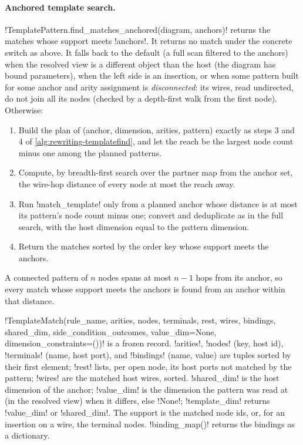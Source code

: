 \paragraph{Anchored template search.}
\py!TemplatePattern.find_matches_anchored(diagram, anchors)! returns the matches whose support
meets \py!anchors!. It returns no match under the concrete switch as above. It falls back to the
default (a full scan filtered to the anchors) when the resolved view is a different object than the
host (the diagram has bound parameters), when the left side is an insertion, or when some pattern
built for some anchor and arity assignment is \emph{disconnected}: its wires, read undirected, do
not join all its nodes (checked by a depth-first walk from the first node). Otherwise:
\begin{enumerate}
\item Build the plan of (anchor, dimension, arities, pattern) exactly as steps 3 and 4 of
  \cref{alg:rewriting-templatefind}, and let the reach be the largest node count minus one among the
  planned patterns.
\item Compute, by breadth-first search over the partner map from the anchor set, the wire-hop
  distance of every node at most the reach away.
\item Run \py!match_template! only from a planned anchor whose distance is at most its pattern's
  node count minus one; convert and deduplicate as in the full search, with the host dimension equal
  to the pattern dimension.
\item Return the matches sorted by the order key whose support meets the anchors.
\end{enumerate}
A connected pattern of $n$ nodes spans at most $n-1$ hops from its anchor, so every match whose
support meets the anchors is found from an anchor within that distance.

\begin{definition}\label{def:rewriting-templatematch}
\py!TemplateMatch(rule_name, arities, nodes, terminals, rest, wires, bindings, shared_dim, side_condition_outcomes, value_dim=None, dimension_constraints=())!
is a frozen record. \py!arities!, \py!nodes! (key, host id), \py!terminals! (name, host port), and
\py!bindings! (name, value) are tuples sorted by their first element; \py!rest! lists, per open
node, its host ports not matched by the pattern; \py!wires! are the matched host wires, sorted.
\py!shared_dim! is the host dimension of the anchor; \py!value_dim! is the dimension the pattern was
read at (in the resolved view) when it differs, else \py!None!; \py!template_dim! returns
\py!value_dim! or \py!shared_dim!. The support is the matched node ids, or, for an insertion on a
wire, the terminal nodes. \py!binding_map()! returns the bindings as a dictionary.
\end{definition}

